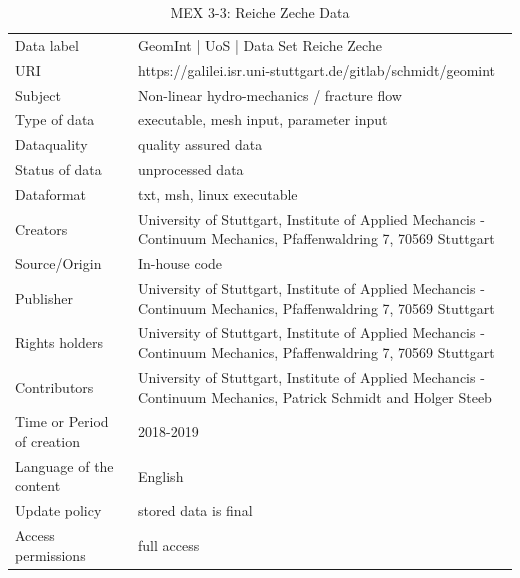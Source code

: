 \begin{table}[!ht]
\caption{MEX 3-3: Reiche Zeche Data}
\label{tab:dms-mex3-3}
\small
\begin{tabular}{R{3cm}|L{7cm}}
\hline
%
Data label & GeomInt | UoS | Data Set Reiche Zeche \\
URI &  https://galilei.isr.uni-stuttgart.de/gitlab/schmidt/geomint\\
Subject  &  Non-linear hydro-mechanics / fracture flow\\
Type of data  &  executable, mesh input, parameter input\\
Dataquality  &  quality assured data \\
Status of data  &  unprocessed data\\
Dataformat  & txt, msh, linux executable\\
Creators  &  University of Stuttgart, Institute of Applied Mechancis - Continuum Mechanics, Pfaffenwaldring 7, 70569 Stuttgart\\
Source/Origin & In-house code \\
Publisher  &  University of Stuttgart, Institute of Applied Mechancis - Continuum Mechanics, Pfaffenwaldring 7, 70569 Stuttgart \\
Rights holders & University of Stuttgart, Institute of Applied Mechancis - Continuum Mechanics, Pfaffenwaldring 7, 70569 Stuttgart \\
Contributors &  University of Stuttgart, Institute of Applied Mechancis - Continuum Mechanics, Patrick Schmidt and Holger Steeb\\
Time or Period of creation &  2018-2019\\
Language of the content &  English\\
Update policy &  stored data is final\\
Access permissions &  full access\\
%
\hline
\end{tabular}
\end{table}